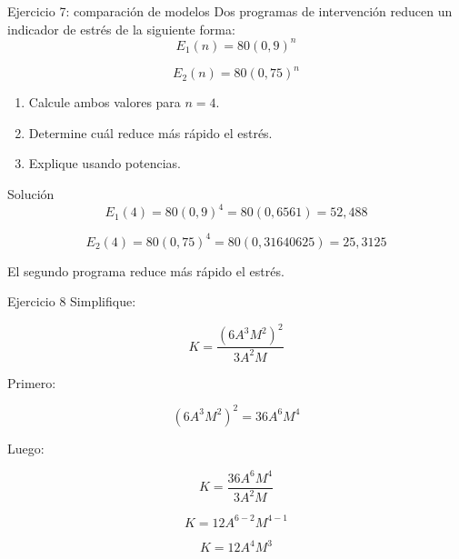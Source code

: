 \documentclass[aspectratio=169]{beamer}
\begin{document}
	
	\begin{frame}{Ejercicio 7: comparación de modelos}
		Dos programas de intervención reducen un indicador de estrés de la siguiente forma:
		\[
		E_1(n)=80(0{,}9)^n
		\]
		
		\[
		E_2(n)=80(0{,}75)^n
		\]
		
		\begin{enumerate}
			\item Calcule ambos valores para \(n=4\).
			\item Determine cuál reduce más rápido el estrés.
			\item Explique usando potencias.
		\end{enumerate}
		
		\pause
		
		\begin{block}{Solución}
			\[
			E_1(4)=80(0{,}9)^4=80(0{,}6561)=52{,}488
			\]
			
			\[
			E_2(4)=80(0{,}75)^4=80(0{,}31640625)=25{,}3125
			\]
			
			El segundo programa reduce más rápido el estrés.
		\end{block}
	\end{frame}
	
	\begin{frame}{Ejercicio 8}
		Simplifique:
		
		\[
		K=
		\frac{(6A^3M^2)^2}{3A^2M}
		\]
		
		\pause
		
		Primero:
		
		\[
		(6A^3M^2)^2
		=
		36A^6M^4
		\]
		
		Luego:
		
		\[
		K=\frac{36A^6M^4}{3A^2M}
		\]
		
		\[
		K=12A^{6-2}M^{4-1}
		\]
		
		\[
		K=12A^4M^3
		\]
		
		
	\end{frame}
	
\end{document}
